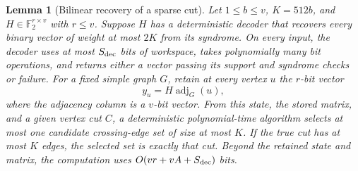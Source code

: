 \documentclass[11pt,letterpaper]{article}
\newtheorem{lemma}[theorem]{Lemma}
\numberwithin{equation}{section}
\begin{document}
\begin{lemma}[Bilinear recovery of a sparse cut]
\label{lem:dense-bilinear-cut}
Let $1\le b\le v$, $K=512b$, and $H\in\mathbb F_2^{r\times v}$ with $r\le v$.
Suppose $H$ has a deterministic decoder that recovers every binary vector of weight at most $2K$ from its syndrome.
On every input, the decoder uses at most $S_{\rm dec}$ bits of workspace, takes polynomially many bit operations, and returns either a vector passing its support and syndrome checks or failure.
For a fixed simple graph $G$, retain at every vertex $u$ the $r$-bit vector
\[
 y_u=H\operatorname{adj}_G(u),
\]
where the adjacency column is a $v$-bit vector.
From this state, the stored matrix, and a given vertex cut $C$, a deterministic polynomial-time algorithm selects at most one candidate crossing-edge set of size at most $K$.
If the true cut has at most $K$ edges, the selected set is exactly that cut.
Beyond the retained state and matrix, the computation uses $O(vr+vA+S_{\rm dec})$ bits.
\end{lemma}
\end{document}
